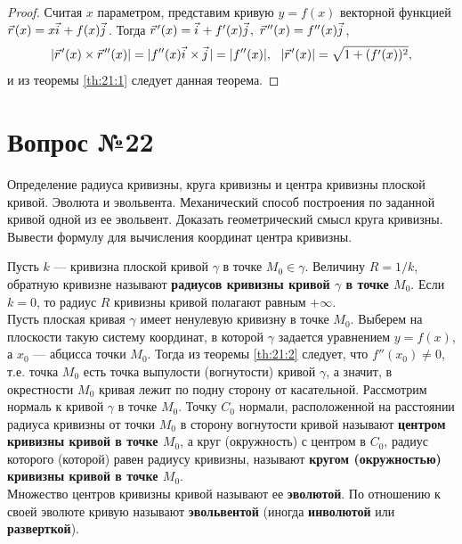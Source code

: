 \documentclass[12pt]{report}
\numberwithin{equation}{section}
\newcommand{\pvec}[1]{\vec{#1}\mkern2mu\vphantom{#1}}
\begin{document}
\begin{proof}
Считая $x$ параметром, представим кривую $y = f(x)$ векторной функцией $\pvec{r}(x) = x \pvec{i} + f(x) \pvec{j}$. Тогда $\pvec{r}'(x) = \pvec{i} + f'(x) \pvec{j},~\pvec{r}''(x) = f''(x)\pvec{j}$,
\[ |\pvec{r}'(x) \times \pvec{r}''(x)| = |f''(x) \pvec{i} \times \pvec{j}| = |f''(x)|,~~ |\pvec{r}'(x)| = \sqrt{1 + (f'(x))^2},\]
и из теоремы \ref{th:21:1} следует данная теорема.
\end{proof}

\newpage \section{Вопрос №22} %
\begin{framed}
Определение радиуса кривизны, круга кривизны и центра кривизны плоской кривой. Эволюта и эвольвента. Механический способ построения по заданной кривой одной из ее эвольвент. Доказать геометрический смысл круга кривизны. Вывести формулу для вычисления
координат центра кривизны.
\end{framed}

Пусть $k$ --- кривизна плоской кривой $\gamma$ в точке $M_0 \in \gamma$. Величину $R = 1 / k$, обратную кривизне называют \textbf{радиусов кривизны кривой $\gamma$ в точке $M_0$}. Если $k = 0$, то радиус $R$ кривизны кривой полагают равным $+\infty$.\\

Пусть плоская кривая $\gamma$ имеет ненулевую кривизну в точке $M_0$. Выберем на плоскости такую систему координат, в которой $\gamma$ задается уравнением $y = f(x)$, а $x_0$ --- абцисса точки $M_0$. Тогда из теоремы \ref{th:21:2} следует, что $f''(x_0) \neq 0$, т.е. точка $M_0$ есть точка выпулости (вогнутости) кривой $\gamma$, а значит, в окрестности $M_0$ кривая лежит по подну сторону от касательной. Рассмотрим нормаль к кривой $\gamma$ в точке $M_0$. Точку $C_0$ нормали, расположенной на расстоянии радиуса кривизны от точки $M_0$ в сторону вогнутости кривой называют \textbf{центром кривизны кривой в точке $M_0$}, а круг (окружность) с центром в $C_0$, радиус которого (которой) равен радиусу кривизны, называют \textbf{кругом (окружностью) кривизны кривой в точке $M_0$}.\\

Множество центров кривизны кривой называют ее \textbf{эволютой}. По отношению к своей эволюте кривую называют \textbf{эвольвентой} (иногда \textbf{инволютой} или \textbf{разверткой}).
\end{document}
